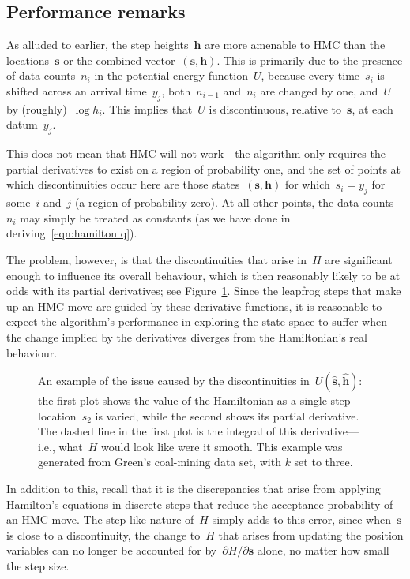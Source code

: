 \documentclass[11pt,a4paper]{article}
\newcommand\ub[1]{\symbf{#1}}                    %
\theoremstyle{definition}
\begin{document}
\subsection{Performance remarks} %

As alluded to earlier, the step heights~$\ub{h}$ are more amenable to HMC than
the locations~$\ub{s}$ or the combined vector~$(\ub{s},\ub{h})$. This is
primarily due to the presence of data counts~$n_i$ in the potential energy
function~$U$, because every time~$s_i$ is shifted across an arrival time~$y_j$,
both~$n_{i-1}$ and~$n_i$ are changed by one, and~$U$ by (roughly)~$\log h_i$.
This implies that~$U$ is discontinuous, relative to~$\ub{s}$, at each
datum~$y_j$.

This does not mean that HMC will not work---the algorithm only requires the
partial derivatives to exist on a region of probability one, and the set of
points at which discontinuities occur here are those states~$(\ub{s},\ub{h})$
for which~$s_i = y_j$ for some~$i$ and~$j$ (a region of probability zero). At
all other points, the data counts~$n_i$ may simply be treated as constants (as
we have done in deriving~\eqref{eqn:hamilton q}).

The problem, however, is that the discontinuities that arise in~$H$ are
significant enough to influence its overall behaviour, which is then reasonably
likely to be at odds with its partial derivatives; see
Figure~\ref{fig:hamiltonian}. Since the leapfrog steps that make up an HMC move
are guided by these derivative functions, it is reasonable to expect the
algorithm's performance in exploring the state space to suffer when the change
implied by the derivatives diverges from the Hamiltonian's real behaviour.

\begin{figure}[t]
  \centering
  
  \caption{An example of the issue caused by the discontinuities
    in~$U(\ub{\hat{s},\ub{\hat{h}}})$: the first plot shows the value of the
    Hamiltonian as a single step location~$s_2$ is varied, while the second
    shows its partial derivative. The dashed line in the first plot is the
    integral of this derivative---i.e., what~$H$ would look like were it smooth.
    This example was generated from Green's coal-mining data set, with $k$ set
    to three.}
  \label{fig:hamiltonian}
\end{figure}

In addition to this, recall that it is the discrepancies that arise from
applying Hamilton's equations in discrete steps that reduce the acceptance
probability of an HMC move. The step-like nature of~$H$ simply adds to this
error, since when~$\ub{s}$ is close to a discontinuity, the change to~$H$ that
arises from updating the position variables can no longer be accounted for
by~$\partial H/\partial \ub{s}$ alone, no matter how small the step size.
\end{document}
